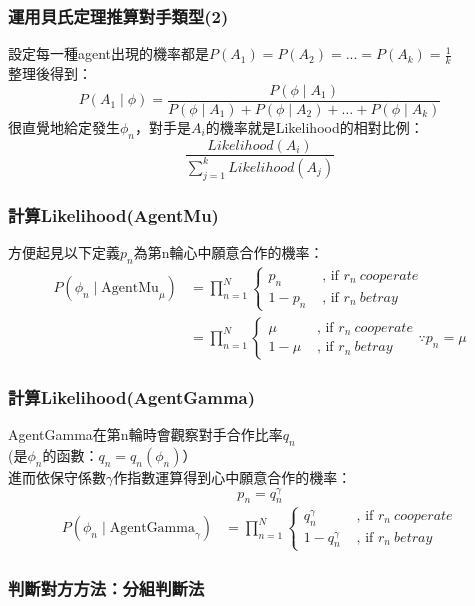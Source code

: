 \documentclass[12pt,a4paper]{beamer}
\begin{document}
\begin{CJK}{UTF8}{bsmi}
\begin{frame}
\frametitle{運用貝氏定理推算對手類型(2)}

設定每一種agent出現的機率都是$P(A_1)=P(A_2)=...=P(A_k)=\frac{1}{k}$  \\
整理後得到：
$$
P(A_1\mid \phi) = \frac{P(\phi \mid A_1)}{P(\phi\mid A_1)+P(\phi\mid A_2)+\dots+P(\phi\mid A_k)}
$$
很直覺地給定發生$\phi_n$，對手是$A_i$的機率就是Likelihood的相對比例：
$$
\frac
{Likelihood(A_i)}
{\sum_{j=1}^k Likelihood(A_j)}
$$

\end{frame}

\begin{frame}
\frametitle{計算Likelihood(AgentMu)}

方便起見以下定義$p_{n}$為第n輪心中願意合作的機率：
$$
\begin{aligned}
P(\phi_n\mid \text{AgentMu}_\mu)
&=
\prod_{n=1}^N
\begin{cases} 
p_{n}&\text{ , if }r_n~cooperate \\ 
1-p_{n}&\text{ , if }r_n~betray 
\end{cases}
\\
&=
\prod_{n=1}^N
\begin{cases} 
\mu&\text{ , if }r_n~cooperate \\ 
1-\mu&\text{ , if }r_n~betray 
\end{cases}
\because p_n=\mu
\end{aligned}
$$

\end{frame}

\begin{frame}
\frametitle{計算Likelihood(AgentGamma)}

AgentGamma在第n輪時會觀察對手合作比率$q_n$ \\
(是$\phi_n$的函數：$q_n=q_n(\phi_n)$）\\
進而依保守係數$\gamma$作指數運算得到心中願意合作的機率：
$$
p_n=q_n^\gamma
$$
$$
\begin{aligned}
P(\phi_n\mid \text{AgentGamma}_\gamma)
&=
\prod_{n=1}^N
\begin{cases} 
q_{n}^\gamma&\text{ , if }r_n~cooperate \\ 
1-q_{n}^\gamma&\text{ , if }r_n~betray 
\end{cases}
\end{aligned}
$$

\end{frame}

\begin{frame}
\frametitle{判斷對方方法：分組判斷法}


\end{frame}
\end{CJK}
\end{document}
